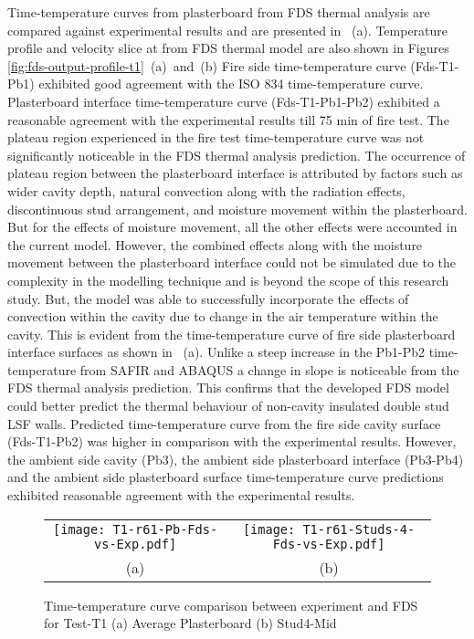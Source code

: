 Time-temperature curves from plasterboard from FDS thermal analysis are compared against experimental results and are presented in ~(a). Temperature profile and velocity slice at from FDS thermal model are also shown in Figures \ref{fig:fds-output-profile-t1}~(a)~and~(b) Fire side time-temperature curve (Fds-T1-Pb1) exhibited good agreement with the ISO 834 time-temperature curve. Plasterboard interface time-temperature curve (Fds-T1-Pb1-Pb2) exhibited a reasonable agreement with the experimental results till 75 min of fire test. The plateau region experienced in the fire test time-temperature curve was not significantly noticeable in the FDS thermal analysis prediction. The occurrence of plateau region between the plasterboard interface is attributed by factors such as wider cavity depth, natural convection along with the radiation effects, discontinuous stud arrangement, and moisture movement within the plasterboard. But for the effects of moisture movement, all the other effects were accounted in the current model. However, the combined effects along with the moisture movement between the plasterboard interface could not be simulated due to the complexity in the modelling technique and is beyond the scope of this research study. But, the model was able to successfully incorporate the effects of convection within the cavity due to change in the air temperature within the cavity. This is evident from the time-temperature curve of fire side plasterboard interface surfaces as shown in ~(a). Unlike a steep increase in the Pb1-Pb2 time-temperature from SAFIR and ABAQUS a change in slope is noticeable from the FDS thermal analysis prediction. This confirms that the developed FDS model could better predict the thermal behaviour of non-cavity insulated double stud LSF walls. Predicted time-temperature curve from the fire side cavity surface (Fds-T1-Pb2) was higher in comparison with the experimental results. However, the ambient side cavity (Pb3), the ambient side plasterboard interface (Pb3-Pb4) and the ambient side plasterboard surface time-temperature curve predictions exhibited reasonable agreement with the experimental results.
\begin{figure}[!htbp]
	\centering
		\begin{tabular}{cc}
			\texttt{[image: T1-r61-Pb-Fds-vs-Exp.pdf]} & \texttt{[image: T1-r61-Studs-4-Fds-vs-Exp.pdf]} \\
			(a) & (b) \\
		\end{tabular} 
		\caption{Time-temperature curve comparison between experiment and FDS for Test-T1 (a) Average Plasterboard (b) Stud4-Mid}
		\label{fig:fds-output-pb-studs-t1}
\end{figure}

